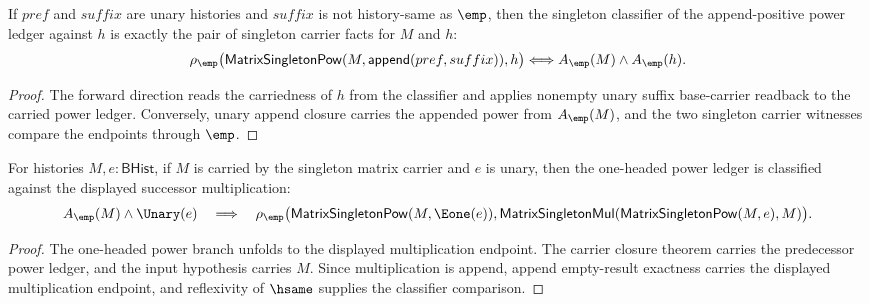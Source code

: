 \begin{theorem}
\label{thm:matrix-singleton-pow-append-positive-suffix-classifier-iff}
If $pref$ and $suffix$ are unary histories and $suffix$ is not history-same as
$\emp$, then the singleton classifier of the append-positive power ledger
against $h$ is exactly the pair of singleton carrier facts for $M$ and $h$:
$$
\rho_{\emp}\bigl(\mathsf{MatrixSingletonPow}(M,\mathsf{append}(pref,suffix)),h\bigr)
\Longleftrightarrow
A_{\emp}(M)\land A_{\emp}(h).
$$
\end{theorem}
\begin{proof}
The forward direction reads the carriedness of $h$ from the classifier and
applies nonempty unary suffix base-carrier readback to the carried power
ledger. Conversely, unary append closure carries the appended power from
$A_{\emp}(M)$, and the two singleton carrier witnesses compare the endpoints
through $\emp$.
\end{proof}

\begin{theorem}
\label{thm:matrix-singleton-pow-succ-classifier}
For histories $M,e:\mathsf{BHist}$, if $M$ is carried by the singleton matrix
carrier and $e$ is unary, then the one-headed power ledger is classified
against the displayed successor multiplication:
$$
A_{\emp}(M)\land\Unary(e)
\quad\Longrightarrow\quad
\rho_{\emp}\bigl(\mathsf{MatrixSingletonPow}(M,\Eone(e)),
\mathsf{MatrixSingletonMul}(\mathsf{MatrixSingletonPow}(M,e),M)\bigr).
$$
\end{theorem}
\begin{proof}
The one-headed power branch unfolds to the displayed multiplication endpoint.
The carrier closure theorem carries the predecessor power ledger, and the
input hypothesis carries $M$. Since multiplication is append, append
empty-result exactness carries the displayed multiplication endpoint, and
reflexivity of $\hsame$ supplies the classifier comparison.
\end{proof}

